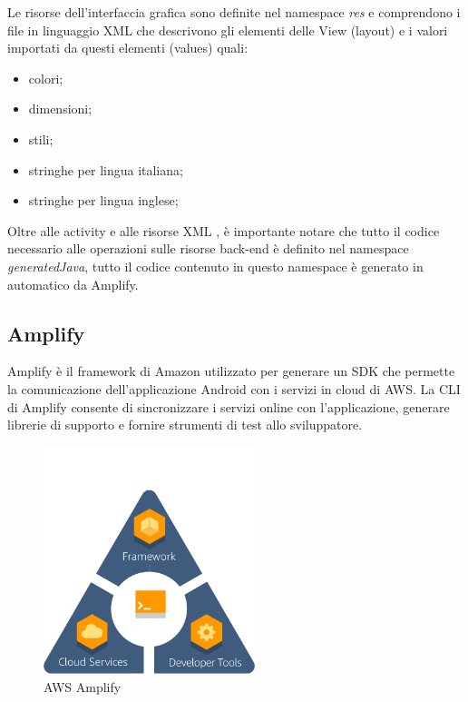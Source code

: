 Le risorse dell'interfaccia grafica sono definite nel namespace \textit{res} e comprendono i file in linguaggio XML che descrivono gli elementi delle View (layout) e i valori importati da questi elementi (values) quali: 
\begin{itemize}
\item colori;
\item dimensioni;
\item stili;
\item stringhe per lingua italiana;
\item stringhe per lingua inglese;
\end{itemize}

Oltre alle activity e alle risorse XML , è importante notare che tutto il codice necessario alle operazioni sulle risorse back-end è definito nel namespace \textit{generatedJava}, tutto il codice contenuto in questo namespace è generato in automatico da Amplify.

\subsection{Amplify}
Amplify è il framework di Amazon utilizzato per generare un SDK che permette la comunicazione dell'applicazione Android con i servizi in cloud di AWS. La CLI di Amplify consente di sincronizzare i servizi online con l'applicazione, generare librerie di supporto e fornire strumenti di test allo sviluppatore.

\begin{figure}[H]
	\begin{center}
		\includegraphics[width=0.55\textwidth, keepaspectratio]{../includes/pics/amplify.png}
		\caption{AWS Amplify}
	\end{center}
\end{figure}

